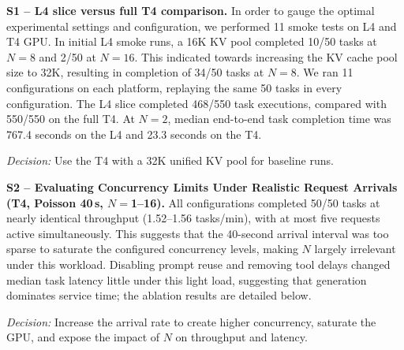 \documentclass[10pt,twocolumn,letterpaper]{article}
\newcommand{\dec}[1]{\par\noindent\textit{Decision:} #1\par}
\begin{document}
\textbf{S1 -- L4 slice versus full T4 comparison.} In order to gauge the optimal experimental settings and configuration, we performed 11 smoke tests on L4 and T4 GPU. In initial L4 smoke runs, a 16K KV pool completed 10/50 tasks at \(N=8\) and 2/50 at \(N=16\). This indicated towards increasing the KV cache pool size to 32K, resulting in completion of 34/50 tasks at \(N=8\). We ran 11 configurations on each platform, replaying the same 50 tasks in every configuration. The L4 slice completed 468/550 task executions, compared with 550/550 on the full T4. At \(N=2\), median end-to-end task completion time was 767.4 seconds on the L4 and 23.3 seconds on the T4.
\dec{Use the T4 with a 32K unified KV pool for baseline runs.}


\textbf{S2 -- Evaluating Concurrency Limits Under Realistic Request Arrivals (T4, Poisson 40\,s, $N{=}$1--16).} All configurations completed 50/50 tasks at nearly identical throughput (1.52--1.56 tasks/min), with at most five requests active simultaneously. This suggests that the 40-second arrival interval was too sparse to saturate the configured concurrency levels, making \(N\) largely irrelevant under this workload. Disabling prompt reuse and removing tool delays changed median task latency little under this light load, suggesting that generation dominates service time; the ablation results are detailed below.
\dec{Increase the arrival rate to create higher concurrency, saturate the GPU, and expose the impact of $N$ on throughput and latency.}

\end{document}
